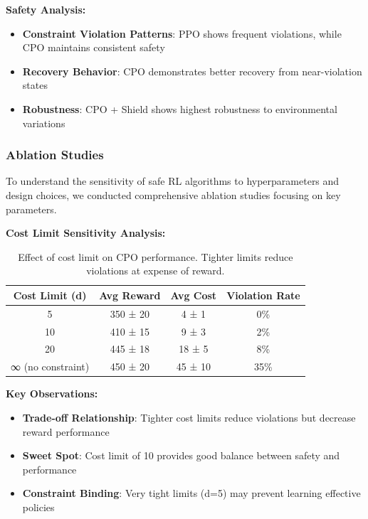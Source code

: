 \documentclass[12pt]{article}
\begin{document}
{{{{\textbf{Safety Analysis:}
\begin{itemize}
\item \textbf{Constraint Violation Patterns}: PPO shows frequent violations, while CPO maintains consistent safety
\item \textbf{Recovery Behavior}: CPO demonstrates better recovery from near-violation states
\item \textbf{Robustness}: CPO + Shield shows highest robustness to environmental variations
\end{itemize}

\subsubsection{Ablation Studies}

To understand the sensitivity of safe RL algorithms to hyperparameters and design choices, we conducted comprehensive ablation studies focusing on key parameters.

\textbf{Cost Limit Sensitivity Analysis:}
\begin{table}[H]
\centering
\begin{tabular}{|c|c|c|c|}
\hline
\textbf{Cost Limit (d)} & \textbf{Avg Reward} & \textbf{Avg Cost} & \textbf{Violation Rate} \\
\hline
5 & 350 ± 20 & 4 ± 1 & 0\% \\
10 & 410 ± 15 & 9 ± 3 & 2\% \\
20 & 445 ± 18 & 18 ± 5 & 8\% \\
∞ (no constraint) & 450 ± 20 & 45 ± 10 & 35\% \\
\hline
\end{tabular}
\caption{Effect of cost limit on CPO performance. Tighter limits reduce violations at expense of reward.}
\end{table}

\textbf{Key Observations:}
\begin{itemize}
\item \textbf{Trade-off Relationship}: Tighter cost limits reduce violations but decrease reward performance
\item \textbf{Sweet Spot}: Cost limit of 10 provides good balance between safety and performance
\item \textbf{Constraint Binding}: Very tight limits (d=5) may prevent learning effective policies
\end{itemize}

}}}}
\end{document}
